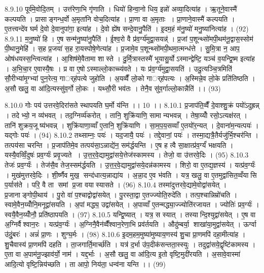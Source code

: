 8.9.10
पूर्व॑मे॒वोदि॒तम् । उत्त॑रेणा॒भि गृ॑णाति । धियो॑ हिन्वा॒नो धिय॒ इन्नो॑ अव्या॒दित्या॑ह । ऋ॒तूने॒वास्मै॑ कल्पयति । प्रासाङ्गन्ध॒र्वो अ॒मृता॑नि वोच॒दित्या॑ह । प्रा॒णा वा अ॒मृताः । प्रा॒णाने॒वास्मै॑ कल्पयति । ए॒तत्त्वन्दे॑व घर्म दे॒वो दे॒वानुपा॑गा॒ इत्या॑ह । दे॒वो ह्ये॑ष सन्दे॒वानु॒पैति॑ । इ॒दम॒हं म॑नु॒ष्यो॑ मनु॒ष्या॑नित्या॑ह । (92)
8.9.11
म॒नु॒ष्यो॑ हि । ए॒ष सन्म॑नु॒ष्या॑नु॒पैति॑ । ई॒श्व॒रो वै प्र॑व॒र्ग्य॑मुद्वा॒सयन्न्॑ । प्र॒जां प॒शून्थ्सो॑मपी॒थम॑नू॒द्वास॒स्सोम॑ पी॒थानु॒मेहि॑ । स॒ह प्र॒जया॑ स॒ह रा॒यस्पोषे॒णेत्या॑ह । प्र॒जामे॒व प॒शून्थ्सो॑मपी॒थमा॒त्मन्ध॑त्ते । सु॒मि॒त्रा न॒ आप॒ ओष॑धयस्स॒न्त्वित्या॑ह । आ॒शिष॑मे॒वैतामा शास्ते । दु॒र्मि॒त्रास्तस्मै॑ भूयासु॒र्योऽस्मान्द्वेष्टि॒ यञ्च॑ व॒यन्द्वि॒ष्म इत्या॑ह । अ॒भि॒चा॒र ए॒वास्यै॒षः । प्र वा ए॒षोऽस्माल्लो॒काच्च्य॑वते । यः प्र॑व॒र्ग्य॑मुद्वा॒सयति॑ । उदु॒त्यञ्चि॒त्रमिति॑ सौ॒रीभ्या॑मृ॒ग्भ्यां पुन॒रेत्य॒ गार््ह॑पत्ये जुहोति । अ॒यव्वैँ लो॒को गार््ह॑पत्यः । अ॒स्मिन्ने॒व लो॒के प्रति॑तिष्ठति । अ॒सौ खलु॒ वा आ॑दि॒त्यस्सु॑व॒र्गो लो॒कः । यथ्सौ॒री भव॑तः । तेनै॒व सु॑व॒र्गाल्लो॒कान्नैति॑ ।। (93)
\anuvakamend

8.10.0
गोः पय॑ उत्तरवे॒दिरा॑सते स्थापयति घ॒र्मो य॑न्ति ।। 10 ।।
8.10.1
प्र॒जाप॑ति॒व्वैँ दे॒वाश्शु॒क्रं पयो॑ऽदुह्रन्न् । तदेभ्यो॒ न व्य॑भवत् । तद॒ग्निर्व्य॑करोत् । तानि॒ शुक्रि॑याणि॒ सामान्यभवन्न् । तेषा॒य्योँ रसो॒ऽत्यक्ष॑रत् । तानि॑ शुक्रय॒जूष्य॑भवन्न् । शुक्रि॑याणा॒व्वाँ ए॒तानि॒ शुक्रि॑याणि । सा॒म॒प॒य॒सव्वाँ ए॒तयो॑र॒न्यत् । दे॒वाना॑म॒न्यत्पयः॑ । यद्गोः पयः॑ । (94)
8.10.2
तथ्साम्नः॒ पयः॑ । यद॒जायै॒ पयः॑ । तद्दे॒वानां॒ पयः॑ । तस्मा॒द्यत्रै॒तैर्यजु॑र्भि॒श्चर॑न्ति । तत्पय॑सा चरन्ति । प्र॒जाप॑तिमे॒व तत्पय॑सा॒ऽन्नाद्ये॑न॒ सम॑र्द्धयन्ति । ए॒ष ह त्वै सा॒क्षात्प्र॑व॒र्ग्यं॑ भक्षयति । यस्यै॒वव्विँ॒दुषः॑ प्रव॒र्ग्यः॑ प्रवृ॒ज्यते । उ॒त्त॒र॒वे॒द्यामुद्वा॑सये॒त्तेज॑स्कामस्य । तेजो॒ वा उ॑त्तरवे॒दिः । (95)
8.10.3
तेजः॑ प्रव॒र्ग्यः॑ । तेज॑सै॒व तेज॒स्सम॑र्द्धयति । उ॒त्त॒र॒वे॒द्यामुद्वा॑सये॒दन्न॑कामस्य । शिरो॒ वा ए॒तद्य॒ज्ञस्य॑ । यत्प्र॑व॒र्ग्यः॑ । मुख॑मुत्तरवे॒दिः । शी॒र्ष्णैव मुख॒ सन्द॑धात्य॒न्नाद्या॑य । अ॒न्ना॒द ए॒व भ॑वति । यत्र॒ खलु॒ वा ए॒तमुद्वा॑सित॒व्वँयासि प॒र्यास॑ते । परि॒ वै ता समां प्र॒जा वयास्यासते । (96)
8.10.4
तस्मा॑दुत्तरवे॒द्यामे॒वोद्वा॑सयेत् । प्र॒जानाङ्गोपी॒थाय॑ । पु॒रो वा॑ प॒श्चाद्वोद्वा॑सयेत् । पु॒रस्ता॒द्वा ए॒तज्ज्योति॒रुदे॑ति । तत्प॒श्चान्निम्रो॑चति । स्वामे॒वैन॒य्योँनि॒मनूद्वा॑सयति । अ॒पां मद्ध्य॒ उद्वा॑सयेत् । अ॒पाव्वाँ ए॒तन्मद्ध्या॒ज्ज्योति॑रजायत । ज्योतिः॑ प्रव॒र्ग्यः॑ । स्वयै॒वैन॒य्योँनौ॒ प्रति॑ष्ठापयति । (97)
8.10.5
यन्द्वि॒ष्यात् । यत्र॒ स स्यात् । तस्यान्दि॒श्युद्वा॑सयेत् । ए॒ष वा अ॒ग्निर्वैश्वान॒रः । यत्प्र॑व॒र्ग्यः॑ । अ॒ग्निनै॒वैन॑व्वैँश्वान॒रेणा॒भि प्रव॑र्तयति । औदु॑म्बर्या॒ शाखा॑या॒मुद्वा॑सयेत् । ऊर्ग्वा उ॑दुं॒बरः॑ । अन्नं॑ प्रा॒णः । शुग्घ॒र्मः । (98)
8.10.6
इ॒दम॒हम॒मुष्या॑मुष्याय॒णस्य॑ शु॒चा प्रा॒णमपि॑ दहा॒मीत्या॑ह । शु॒चैवास्य॑ प्रा॒णमपि॑ दहति । ता॒जगार्ति॒मार्च्छ॑ति । यत्र॑ द॒र्भा उ॑प॒दीक॑सन्तता॒स्स्युः । तदुद्वा॑सये॒द्वृष्टि॑कामस्य । ए॒ता वा अ॒पाम॑नू॒ज्झाव॑र्यो॒ नाम॑ । यद्द॒र्भाः । अ॒सौ खलु॒ वा आ॑दि॒त्य इ॒तो वृष्टि॒मुदी॑रयति । अ॒सावे॒वास्मा॑ आदि॒त्यो वृष्टि॒न्निय॑च्छति । ता आपो॒ निय॑ता॒ धन्व॑ना यन्ति ।। (99)
\anuvakamend

